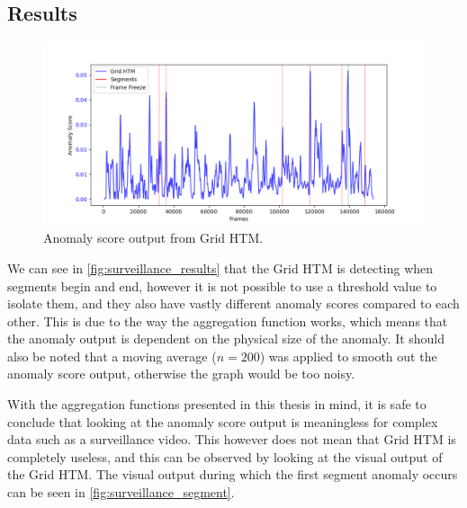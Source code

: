 \subsection{Results}
\begin{figure}[H]
    \centering
    \includegraphics[width=\textwidth]{resources/experiments/surveillance/surveillance_result}
    \caption[Grid HTM Anomaly Score Output]{Anomaly score output from Grid HTM.}
    \label{fig:surveillance_results}
\end{figure}
We can see in \autoref{fig:surveillance_results} that the Grid HTM is detecting when segments begin and end, however it is not possible to use a threshold value to isolate them, and they also have vastly different anomaly scores compared to each other. This is due to the way the aggregation function works, which means that the anomaly output is dependent on the physical size of the anomaly. It should also be noted that a moving average ($n=200$) was applied to smooth out the anomaly score output, otherwise the graph would be too noisy.
\par
With the aggregation functions presented in this thesis in mind, it is safe to conclude that looking at the anomaly score output is meaningless for complex data such as a surveillance video. This however does not mean that Grid HTM is completely useless, and this can be observed by looking at the visual output of the Grid HTM. The visual output during which the first segment anomaly occurs can be seen in \autoref{fig:surveillance_segment}.
